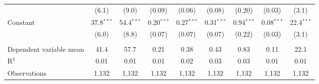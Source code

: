 \begin{adjustbox}{width = \textwidth, center}
\begin{tabular}{lcccccccc}
                              & (6.1)         & (9.0)             & (0.09)       & (0.06)            & (0.08)       & (0.20)        & (0.03)           & (3.1)\\   
      Constant                & 37.8$^{***}$  & 54.4$^{***}$      & 0.20$^{***}$ & 0.27$^{***}$      & 0.31$^{***}$ & 0.94$^{***}$  & 0.08$^{***}$     & 22.4$^{***}$\\   
                              & (6.0)         & (8.8)             & (0.07)       & (0.07)            & (0.07)       & (0.22)        & (0.03)           & (3.1)\\   
       \\
      Dependent variable mean & 41.4          & 57.7              & 0.21         & 0.38              & 0.43         & 0.83          & 0.11             & 22.1\\  
      R$^2$                   & 0.01          & 0.01              & 0.01         & 0.02              & 0.03         & 0.03          & 0.01             & 0.01\\  
      Observations            & 1,132         & 1,132             & 1,132        & 1,132             & 1,132        & 1,132         & 1,132            & 1,132\\  
      \bottomrule
   \end{tabular}
\end{adjustbox}
\par\endgroup


